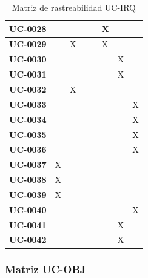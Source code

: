 \begin{table}[H]
\begin{tabular}{|p{2.2cm}|p{1.9cm}|p{1.9cm}|p{1.9cm}|p{1.9cm}|p{1.9cm}|p{1.9cm}|p{1.9cm}|}
\hline
\textbf{UC-0028} & & & & & X & & \\
\hline
\textbf{UC-0029} & & X & & & X & & \\
\hline
\textbf{UC-0030} & & & & & & X & \\
\hline
\textbf{UC-0031} & & & & & & X & \\
\hline
\textbf{UC-0032} & & X & & & & & \\
\hline
\textbf{UC-0033} & & & & & & & X \\
\hline
\textbf{UC-0034} & & & & & & & X \\
\hline
\textbf{UC-0035} & & & & & & & X \\
\hline
\textbf{UC-0036} & & & & & & & X \\
\hline
\textbf{UC-0037} & X & & & & & & \\
\hline
\textbf{UC-0038} & X & & & & & & \\
\hline
\textbf{UC-0039} & X & & & & & & \\
\hline
\textbf{UC-0040} & & & & & & & X \\
\hline
\textbf{UC-0041} & & & & & & X & \\
\hline
\textbf{UC-0042} & & & & & & X & \\
\hline
\end{tabular}
\caption{Matriz de rastreabilidad UC-IRQ}
\label{tab:matriz-uc-irq}
\end{table}

\subsubsection{Matriz UC-OBJ}

